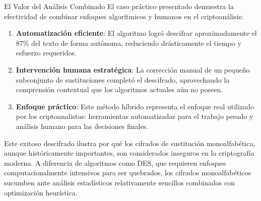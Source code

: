 \begin{cryptomethod}{El Valor del Análisis Combinado}
El caso práctico presentado demuestra la efectividad de combinar enfoques algorítmicos y humanos en el criptoanálisis:

\begin{enumerate}
    \item \textbf{Automatización eficiente}: El algoritmo logró descifrar aproximadamente el 87\% del texto de forma autónoma, reduciendo drásticamente el tiempo y esfuerzo requeridos.
    
    \item \textbf{Intervención humana estratégica}: La corrección manual de un pequeño subconjunto de sustituciones completó el descifrado, aprovechando la comprensión contextual que los algoritmos actuales aún no poseen.
    
    \item \textbf{Enfoque práctico}: Este método híbrido representa el enfoque real utilizado por los criptoanalistas: herramientas automatizadas para el trabajo pesado y análisis humano para las decisiones finales.
\end{enumerate}

Este exitoso descifrado ilustra por qué los cifrados de sustitución monoalfabética, aunque históricamente importantes, son considerados inseguros en la criptografía moderna. A diferencia de algoritmos como DES, que requieren enfoques computacionalmente intensivos para ser quebrados, los cifrados monoalfabéticos sucumben ante análisis estadísticos relativamente sencillos combinados con optimización heurística.
\end{cryptomethod}